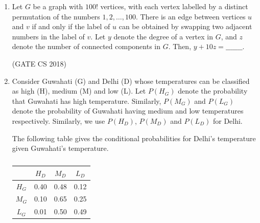 \documentclass[12pt]{article}
\begin{document}
\begin{enumerate}
\textbf{Schema IV:} \emph{Registration (\underline{rollno}, \underline{courseid}, credit)}\\
Non-trivial functional dependencies: \\
$\qquad (\textit{rollno}, \textit{courseid}) \rightarrow \textit{credit}$\\
$\qquad \textit{courseid} \rightarrow \textit{credit}$

Which one of the relational schemas above is in 3NF but not in BCNF?

\begin{multicols}{4}
\begin{enumerate}
\item Schema I
\item Schema II
\item Schema III
\item Schema IV
\end{enumerate}
\end{multicols}

(GATE CS 2018)

\item Let $G$ be a graph with $100!$ vertices, with each vertex labelled by a distinct permutation of
the numbers $1,2,\dots,100$. There is an edge between vertices $u$ and $v$ if and only if the label
of $u$ can be obtained by swapping two adjacent numbers in the label of $v$. Let $y$ denote the
degree of a vertex in $G$, and $z$ denote the number of connected components in $G$. Then,
$y + 10z = \_\_\_\_\_\_\_$.

(GATE CS 2018)

\item Consider Guwahati (G) and Delhi (D) whose temperatures can be classified as high (H),
medium (M) and low (L). Let $P(H_G)$ denote the probability that Guwahati has high
temperature. Similarly, $P(M_G)$ and $P(L_G)$ denote the probability of Guwahati having
medium and low temperatures respectively. Similarly, we use $P(H_D)$, $P(M_D)$ and $P(L_D)$ for
Delhi.

The following table gives the conditional probabilities for Delhi’s temperature given
Guwahati’s temperature.

\begin{table}[H]
\centering
\caption{} \label{} 
\begin{tabular}{|c|c|c|c|}
\hline
 & $H_D$ & $M_D$ & $L_D$ \\
\hline
$H_G$ & 0.40 & 0.48 & 0.12 \\
$M_G$ & 0.10 & 0.65 & 0.25 \\
$L_G$ & 0.01 & 0.50 & 0.49 \\
\hline
\end{tabular}
\end{table}


\end{enumerate}
\end{document}
